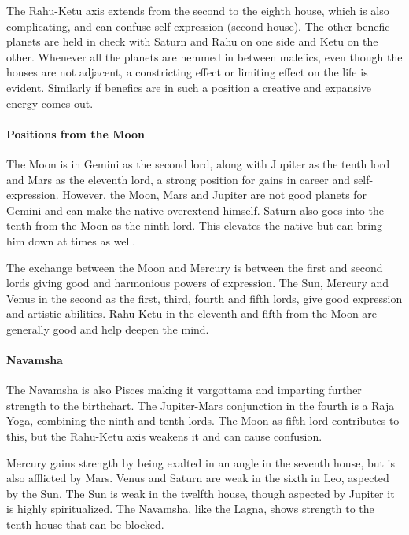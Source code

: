  

The Rahu-Ketu axis extends from the second to the eighth house, which is also complicating, and can confuse self-expression (second house). The other benefic planets are held in check with Saturn and Rahu on one side and Ketu on the other. Whenever all the planets are hemmed in between malefics, even though the houses are not adjacent, a constricting effect or limiting effect on the life is evident. Similarly if benefics are in such a position a creative and expansive energy comes out.

 

\paragraph{Positions from the Moon}

 

The Moon is in Gemini as the second lord, along with Jupiter as the tenth lord and Mars as the eleventh lord, a strong position for gains in career and self-expression. However, the Moon, Mars and Jupiter are not good planets for Gemini and can make the native overextend himself. Saturn also goes into the tenth from the Moon as the ninth lord. This elevates the native but can bring him down at times as well.

 

The exchange between the Moon and Mercury is between the first and second lords giving good and harmonious powers of expression. The Sun, Mercury and Venus in the second as the first, third, fourth and fifth lords, give good expression and artistic abilities. Rahu-Ketu in the eleventh and fifth from the Moon are generally good and help deepen the mind.

 

\paragraph{Navamsha}

 

The Navamsha is also Pisces making it vargottama and imparting further strength to the birthchart. The Jupiter-Mars conjunction in the fourth is a Raja Yoga, combining the ninth and tenth lords. The Moon as fifth lord contributes to this, but the Rahu-Ketu axis weakens it and can cause confusion.

 

Mercury gains strength by being exalted in an angle in the seventh house, but is also afflicted by Mars. Venus and Saturn are weak in the sixth in Leo, aspected by the Sun. The Sun is weak in the twelfth house, though aspected by Jupiter it is highly spiritualized. The Navamsha, like the Lagna, shows strength to the tenth house that can be blocked.

